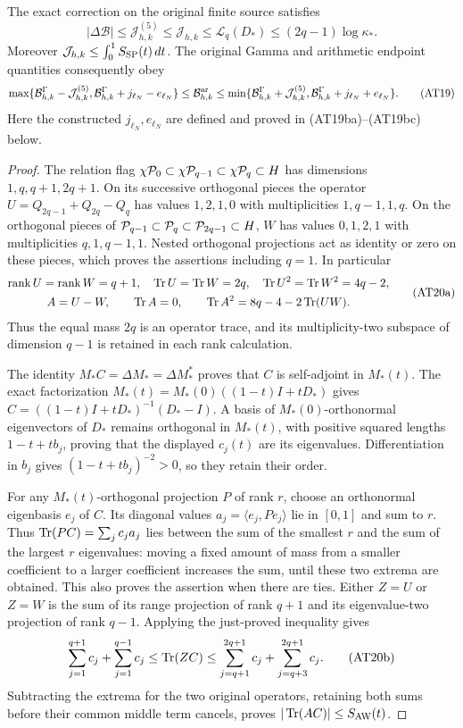 \begin{theorem}
The exact correction on the original finite source satisfies
\[
 \boxed{|\Delta\mathcal B|\le\mathcal J_{h,k}^{(5)}\le\mathcal J_{h,k}
       \le\mathcal L_q(D_*)\le(2q-1)\log\kappa_*.}
 \tag{AT18}
\]
Moreover $\mathcal J_{h,k}\le\int_0^1S_{\rm SP}(t)\,dt$. The
original Gamma and arithmetic endpoint quantities consequently obey
\[
 \max\{\mathcal B^\Gamma_{h,k}-\mathcal J_{h,k}^{(5)},
        \mathcal B^\Gamma_{h,k}+j_{\ell_N}-e_{\ell_N}\}
 \le\mathcal B^{\mathrm{ar}}_{h,k}
 \le\min\{\mathcal B^\Gamma_{h,k}+\mathcal J_{h,k}^{(5)},
        \mathcal B^\Gamma_{h,k}+j_{\ell_N}+e_{\ell_N}\}.
 \tag{AT19}
\]
Here the constructed $j_{\ell_N},e_{\ell_N}$ are defined and proved in (AT19ba)--(AT19bc) below.
\end{theorem}
\begin{proof}
The relation flag
$\chi\mathcal P_0\subset\chi\mathcal P_{q-1}\subset\chi\mathcal P_q\subset H$
has dimensions $1,q,q+1,2q+1$. On its successive orthogonal
pieces the operator $U=Q_{2q-1}+Q_{2q}-Q_q$ has values
$1,2,1,0$ with multiplicities $1,q-1,1,q$.
On the orthogonal pieces of
$\mathcal P_{q-1}\subset\mathcal P_q\subset\mathcal P_{2q-1}\subset H$,
$W$ has values $0,1,2,1$ with multiplicities $q,1,q-1,1$.
Nested orthogonal projections act as identity or zero on these
pieces, which proves the assertions including $q=1$. In particular
\[
 \begin{gathered}
 \operatorname{rank}U=\operatorname{rank}W=q+1,\quad
 \operatorname{Tr} U=\operatorname{Tr} W=2q,\quad \operatorname{Tr} U^2=\operatorname{Tr} W^2=4q-2,\\
 A=U-W,\qquad \operatorname{Tr} A=0,\qquad
 \operatorname{Tr} A^2=8q-4-2\operatorname{Tr}(UW).
 \end{gathered}
 \tag{AT20a}
\]
Thus the equal mass $2q$ is an operator trace, and its multiplicity-two
subspace of dimension $q-1$ is retained in each rank calculation.

The identity $M_*C=\Delta M_*=\Delta M_*^*$ proves that $C$ is
self-adjoint in $M_*(t)$. The exact factorization
$M_*(t)=M_*(0)((1-t)I+tD_*)$ gives
$C=((1-t)I+tD_*)^{-1}(D_*-I)$. A basis of $M_*(0)$-orthonormal
eigenvectors of $D_*$ remains orthogonal in $M_*(t)$, with positive
squared lengths $1-t+tb_j$, proving that the displayed $c_j(t)$
are its eigenvalues. Differentiation in $b_j$ gives
$(1-t+tb_j)^{-2}>0$, so they retain their order.

For any $M_*(t)$-orthogonal projection $P$ of rank $r$, choose an
orthonormal eigenbasis $e_j$ of $C$. Its diagonal values
$a_j=\langle e_j,Pe_j\rangle$ lie in $[0,1]$ and sum to $r$.
Thus $\operatorname{Tr}(PC)=\sum_jc_ja_j$ lies between the sum of the smallest
$r$ and the sum of the largest $r$ eigenvalues: moving a fixed
amount of mass from a smaller coefficient to a larger coefficient
increases the sum, until these two extrema are obtained. This also
proves the assertion when there are ties. Either $Z=U$ or $Z=W$
is the sum of its range projection of rank $q+1$ and its
eigenvalue-two projection of rank $q-1$. Applying the just-proved
inequality gives
\[
 \sum_{j=1}^{q+1}c_j+\sum_{j=1}^{q-1}c_j
 \le\operatorname{Tr}(ZC)\le
 \sum_{j=q+1}^{2q+1}c_j+\sum_{j=q+3}^{2q+1}c_j.
 \tag{AT20b}
\]
Subtracting the extrema for the two original operators, retaining
both sums before their common middle term cancels, proves
$|\operatorname{Tr}(AC)|\le S_{\rm AW}(t)$.


\end{proof}
